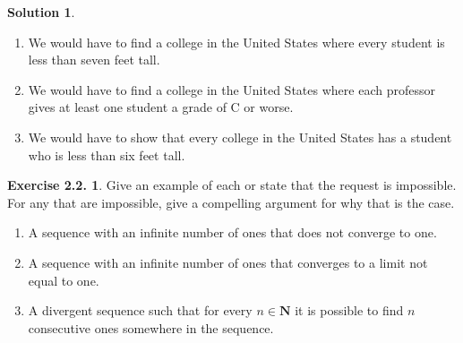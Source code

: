 \documentclass[12pt]{article}
\theoremstyle{definition}
\theoremstyle{exercise}
\newtheorem{exercise}{Exercise 2.2.}
\theoremstyle{solution}
\newtheorem*{solution}{Solution}
\newcommand{\N}{\mathbf{N}}
\begin{document}
\begin{solution}
    \begin{enumerate}
        \item We would have to find a college in the United States where every student is less than seven feet tall.

        \item We would have to find a college in the United States where each professor gives at least one student a grade of C or worse.

        \item We would have to show that every college in the United States has a student who is less than six feet tall.
    \end{enumerate}
\end{solution}

\begin{exercise}
\label{ex:4}
    Give an example of each or state that the request is impossible. For any that are impossible, give a compelling argument for why that is the case.
    \begin{enumerate}
        \item A sequence with an infinite number of ones that does not converge to one.

        \item A sequence with an infinite number of ones that converges to a limit not equal to one.

        \item A divergent sequence such that for every \( n \in \N \) it is possible to find \( n \) consecutive ones somewhere in the sequence.
    \end{enumerate}
\end{exercise}
\end{document}
